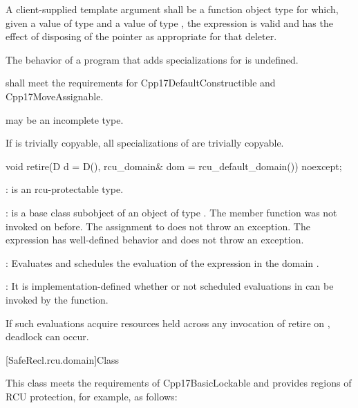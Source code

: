 \pnum
A client-supplied template argument  shall be a
function object type  for which,
given a value  of type  and a value 
of type , the expression  is valid and
has the effect of disposing of the pointer as appropriate for
that deleter.

\pnum
The behavior of a program that adds specializations for
 is undefined.

\pnum
{} shall meet the requirements for
Cpp17DefaultConstructible and Cpp17MoveAssignable.

\pnum
{} may be an incomplete type.

\pnum
If  is trivially copyable, all specializations of
 are trivially copyable.

\begin{codeblock}
void retire(D d = D(), rcu_domain& dom = rcu_default_domain()) noexcept;
\end{codeblock}

\pnum
{}:  is an rcu-protectable type.

\pnum
{}:  is a base class subobject of
an object  of type . The member function
 was not invoked on 
before. The assignment to  does not throw an
exception. The expression  has
well-defined behavior and does not throw an exception.

\pnum	{}: Evaluates  and schedules
the evaluation of the expression 
in the domain .

\pnum	{}: It is implementation-defined whether or not scheduled
evaluations in  can be invoked by the 
function.
\begin{note}
If such evaluations acquire resources held across any invocation of
retire on , deadlock can occur.
\end{note}

[SafeRecl.rcu.domain]{Class }


This class meets the requirements of Cpp17BasicLockable  and provides regions of RCU protection, for example, as follows:

